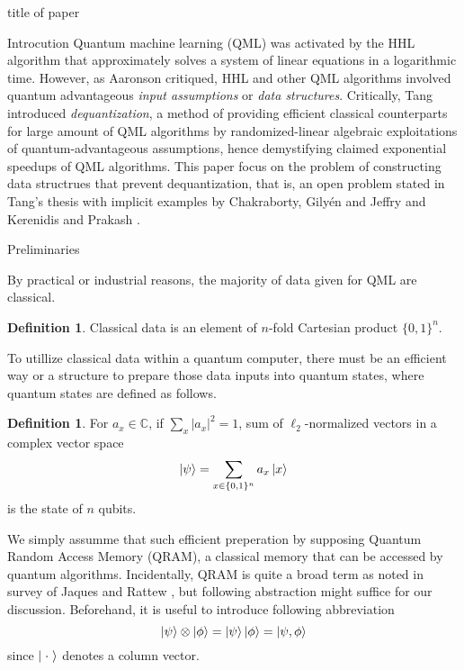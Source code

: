 \documentclass[10pt,twoside,reqno]{amsart} %
\makeatletter
\renewcommand{\section}{\@startsection{section}{1}
   \z@{.7\linespacing\@plus\linespacing}{.5\linespacing}
   {\normalfont\upshape\bfseries\centering}}
\theoremstyle{plain}
\theoremstyle{definition}
\newtheorem{defn}[thm]{Definition}
\makeatother
\begin{document}
\pagestyle{myheadings}
         {\centerline {\scriptsize  title of paper  }}


\bigskip
\section{Introcution}
Quantum machine learning (QML) was activated by the HHL algorithm
\cite{harrow2009} that approximately solves a system of linear equations in a
logarithmic time. However, as Aaronson \cite{aaronson2015} critiqued, HHL and
other QML algorithms involved quantum advantageous \emph{input assumptions} 
or \emph{data structures}. Critically, Tang \cite{tang2019} introduced
\emph{dequantization}, a method of providing efficient classical counterparts
for large amount of QML algorithms by randomized-linear algebraic exploitations of
quantum-advantageous assumptions, hence demystifying claimed exponential
speedups of QML algorithms. This paper focus on the problem of constructing
data structrues that prevent dequantization, that is, an open problem stated
in Tang's thesis \cite{tang2023} with implicit examples by Chakraborty, Gily\'en 
and Jeffry \cite{chakraborty2019} and Kerenidis and Prakash \cite{kerenidis2020}.

\section{Preliminaries}

By practical or industrial reasons, the majority of data given for QML are
classical.
\begin{defn}
  Classical data is an element of $n$-fold Cartesian product $\{0,1\}^n$.
\end{defn}

To utillize classical data within a quantum computer, there must be an efficient
way or a structure to prepare those data inputs into quantum states, where
quantum states are defined as follows.

\begin{defn}
  For $a_x\in\mathbb{C}$, if $\sum_x|a_x|^2=1$, sum of $\ell_2$-normalized
  vectors in a complex vector space
  \[
    \ket{\psi} = \sum_{x\in\{0,1\}^n}a_x\ket{x}
  \]
  is the state of $n$ qubits.
\end{defn}

We simply assumme that such efficient preperation by supposing Quantum Random
Access Memory (QRAM), a classical memory that can be accessed by quantum
algorithms. Incidentally, QRAM is quite a broad term
as noted in survey of Jaques and Rattew \cite{jaques2023}, but following
abstraction might suffice for our discussion. Beforehand, it is useful to
introduce following abbreviation
\[
  \ket{\psi}\otimes\ket{\phi} = \ket{\psi}\ket{\phi} = \ket{\psi, \phi}
\]
since $\ket{\;\cdot\;}$ denotes a column vector.
\end{document}
